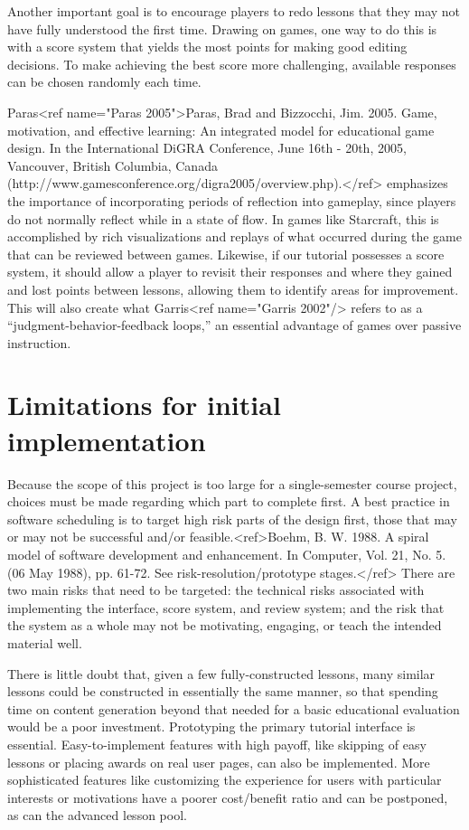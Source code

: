 \documentclass{acm_proc_article-sp}
\begin{document}
Another important goal is to encourage players to redo lessons that they may not have fully understood the first time. Drawing on games, one way to do this is with a score system that yields the most points for making good editing decisions. To make achieving the best score more challenging, available responses can be chosen randomly each time.

Paras<ref name="Paras 2005">Paras, Brad and Bizzocchi, Jim. 2005. Game, motivation, and effective learning: An integrated model for educational game design. In the International DiGRA Conference, June 16th - 20th, 2005, Vancouver, British Columbia, Canada (http://www.gamesconference.org/digra2005/overview.php).</ref> emphasizes the importance of incorporating periods of reflection into gameplay, since players do not normally reflect while in a state of flow. In games like Starcraft, this is accomplished by rich visualizations and replays of what occurred during the game that can be reviewed between games. Likewise, if our tutorial possesses a score system, it should allow a player to revisit their responses and where they gained and lost points between lessons, allowing them to identify areas for improvement. This will also create what Garris<ref name="Garris 2002"/> refers to as a “judgment-behavior-feedback loops,” an essential advantage of games over passive instruction.

\section{Limitations for initial implementation}

Because the scope of this project is too large for a single-semester course project, choices must be made regarding which part to complete first. A best practice in software scheduling is to target high risk parts of the design first, those that may or may not be successful and/or feasible.<ref>Boehm, B. W. 1988. A spiral model of software development and enhancement. In Computer, Vol. 21, No. 5. (06 May 1988), pp. 61-72. See risk-resolution/prototype stages.</ref> There are two main risks that need to be targeted: the technical risks associated with implementing the interface, score system, and review system; and the risk that the system as a whole may not be motivating, engaging, or teach the intended material well.

There is little doubt that, given a few fully-constructed lessons, many similar lessons could be constructed in essentially the same manner, so that spending time on content generation beyond that needed for a basic educational evaluation would be a poor investment. Prototyping the primary tutorial interface is essential. Easy-to-implement features with high payoff, like skipping of easy lessons or placing awards on real user pages, can also be implemented. More sophisticated features like customizing the experience for users with particular interests or motivations have a poorer cost/benefit ratio and can be postponed, as can the advanced lesson pool.
\end{document}
